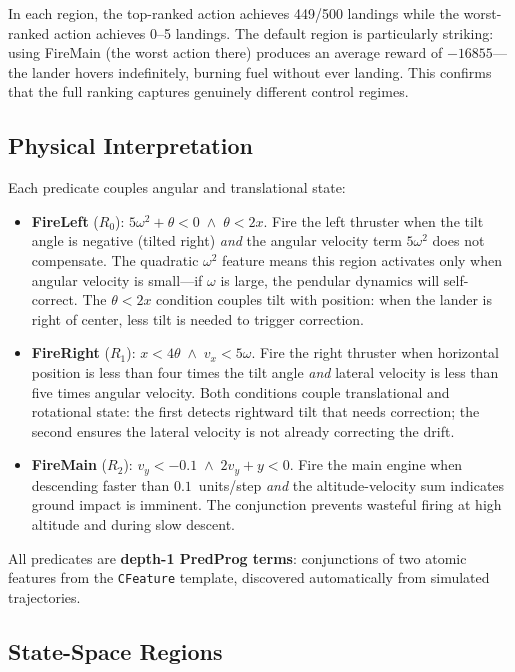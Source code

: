 \documentclass[9pt,a4paper]{article}
\theoremstyle{plain}
\theoremstyle{definition}
\theoremstyle{remark}
\begin{document}
In each region, the top-ranked action achieves 449/500 landings while
the worst-ranked action achieves 0--5 landings. The default region is
particularly striking: using FireMain (the worst action there)
produces an average reward of $-16855$---the lander hovers
indefinitely, burning fuel without ever landing. This confirms
that the full ranking captures genuinely different control regimes.

\subsection{Physical Interpretation}

Each predicate couples angular and translational state:

\begin{itemize}
\item \textbf{FireLeft} ($R_0$): $5\omega^2 + \theta < 0 \;\wedge\;
\theta < 2x$. Fire the left thruster when the tilt angle is
negative (tilted right) \emph{and} the angular velocity term
$5\omega^2$ does not compensate. The quadratic $\omega^2$ feature
means this region activates only when angular velocity is small---if
$\omega$ is large, the pendular dynamics will self-correct. The
$\theta < 2x$ condition couples tilt with position: when the
lander is right of center, less tilt is needed to trigger
correction.

\item \textbf{FireRight} ($R_1$): $x < 4\theta \;\wedge\;
v_x < 5\omega$. Fire the right thruster when horizontal position
is less than four times the tilt angle \emph{and} lateral velocity
is less than five times angular velocity. Both conditions couple
translational and rotational state: the first detects rightward
tilt that needs correction; the second ensures the lateral
velocity is not already correcting the drift.

\item \textbf{FireMain} ($R_2$): $v_y < -0.1 \;\wedge\;
2v_y + y < 0$. Fire the main engine when descending faster than
$0.1$~units/step \emph{and} the altitude-velocity sum indicates
ground impact is imminent. The conjunction prevents wasteful
firing at high altitude and during slow descent.
\end{itemize}

All predicates are \textbf{depth-1 PredProg terms}: conjunctions
of two atomic features from the \texttt{CFeature} template,
discovered automatically from simulated trajectories.

\subsection{State-Space Regions}
\end{document}
